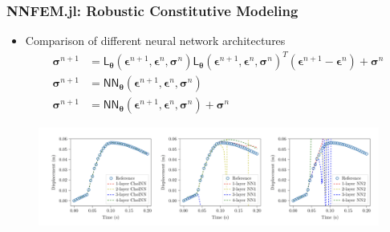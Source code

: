 \documentclass{beamer}
\newcommand{\ChoL}{\mathsf{L}}
\newcommand{\bt}[0]{\bm{\theta}}
\begin{document}
\begin{frame}
	\frametitle{NNFEM.jl: Robustic Constitutive Modeling}
	\begin{itemize}
		\item Comparison of different neural network architectures 
		\begin{align*}
			\bm\sigma^{n+1} &= \ChoL_{\bt}(\bm\epsilon^{n+1},\bm{\epsilon}^{n},\bm{\sigma}^{n}) \ChoL_{\bt}(\bm\epsilon^{n+1},\bm{\epsilon}^{n},\bm{\sigma}^{n})^T (\bm{\epsilon}^{n+1} - \bm{\epsilon}^{n})  + \bm{\sigma}^{n} \\
			\bm{\sigma}^{n+1} &=  \mathsf{NN}_{\bt}(\bm\epsilon^{n+1},\bm{\epsilon}^{n},\bm{\sigma}^{n})\\
			\bm{\sigma}^{n+1} &=  \mathsf{NN}_{\bt}(\bm\epsilon^{n+1},\bm{\epsilon}^{n},\bm{\sigma}^{n}) + \bm{\sigma}^{n}
		\end{align*}
	\end{itemize}
\begin{figure}[hbt]
  \includegraphics[width=1.0\textwidth]{../nncons}
\end{figure}
\end{frame}
\end{document}
